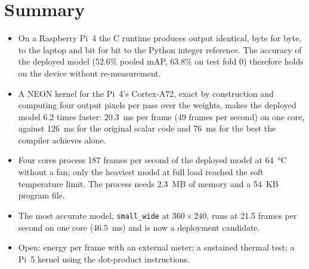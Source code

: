 \documentclass[11pt,a4paper]{article}
\newcommand{\cfg}[1]{\texttt{#1}}
\begin{document}
\section{Summary}

\begin{itemize}
  \item On a Raspberry Pi~4 the C runtime produces output identical, byte for
  byte, to the laptop and bit for bit to the Python integer reference. The
  accuracy of the deployed model (52.6\% pooled mAP, 63.8\% on test fold 0)
  therefore holds on the device without re-measurement.
  \item A NEON kernel for the Pi~4's Cortex-A72, exact by construction and
  computing four output pixels per pass over the weights, makes the deployed
  model 6.2 times faster: 20.3~ms per frame (49 frames per second) on one
  core, against 126~ms for the original scalar code and 76~ms for the best
  the compiler achieves alone.
  \item Four cores process 187 frames per second of the deployed model at
  \SI{64}{\celsius} without a fan; only the heaviest model at full load
  reached the soft temperature limit. The process needs 2.3~MB of memory and a 54~KB
  program file.
  \item The most accurate model, \cfg{small\_wide} at $360 \times 240$, runs
  at 21.5 frames per second on one core (46.5~ms) and is now a deployment
  candidate.
  \item Open: energy per frame with an external meter; a sustained thermal
  test; a Pi~5 kernel using the dot-product instructions.
\end{itemize}
\end{document}
